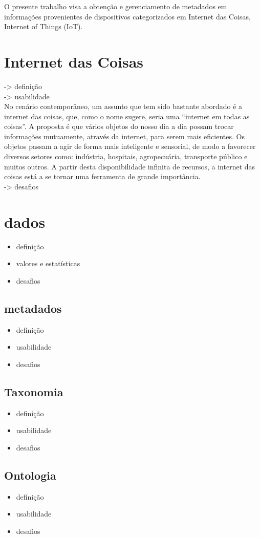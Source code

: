 O presente trabalho visa a obtenção e gerenciamento de metadados em informações provenientes de
dispositivos categorizados em Internet das Coisas, Internet of Things (IoT). %


\section{Internet das Coisas}%

	-> definição\\
	-> usabilidade\\
	No cenário contemporâneo, um assunto que tem sido bastante abordado é a
 internet das coisas, que, como o nome sugere, seria uma “internet em todas as
 coisas”. A proposta é que vários objetos do nosso dia a dia possam trocar informações
 mutuamente, através da internet, para serem mais eficientes. Os objetos passam a agir
 de forma mais inteligente e sensorial, de modo a favorecer diversos setores como:
 indústria, hospitais, agropecuária, transporte público e muitos outros. A partir desta
 disponibilidade infinita de recursos, a internet das coisas está a se tornar uma ferramenta
 de grande importância.\\
	-> desafios\\
\section{dados}%
	\begin{itemize}
		\item definição
		\item valores e estatísticas
		\item desafios
	\end{itemize}
	\subsection{metadados}
		\begin{itemize}
			\item definição
			\item usabilidade
			\item desafios
		\end{itemize}
	\subsection{Taxonomia}
		\begin{itemize}
			\item definição
			\item usabilidade
			\item desafios
		\end{itemize}
	\subsection{Ontologia}
		\begin{itemize}
			\item definição
		 	\item usabilidade
			\item desafios
		\end{itemize}

